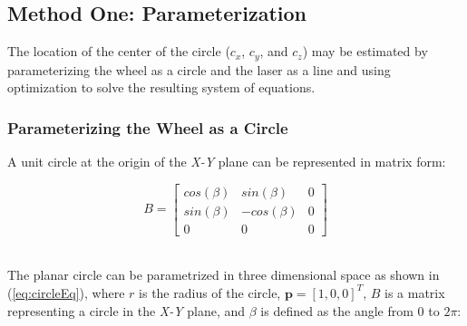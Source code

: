 \documentclass[12pt]{article}
\begin{document}
\subsection{Method One: Parameterization}

The location of the center of the circle ($c_x$, $c_y$, and $c_z$) may be estimated by parameterizing the wheel as a circle and the laser as a line and using optimization to solve the resulting system of equations. 


\subsubsection{Parameterizing the Wheel as a Circle}

A unit circle at the origin of the \textit{X-Y} plane can be represented in matrix form:  

\begin{equation}
	B=\begin{bmatrix}
       cos(\beta) & sin(\beta) & 0 \\
       sin(\beta) & -cos(\beta) & 0\\
       0 & 0 & 0
    \end{bmatrix}
    \label{eq:circleXY}
\end{equation}
\\

The planar circle can be parametrized in three dimensional space as shown in (\ref{eq:circleEq}), where $r$ is the radius of the circle, $\mathbf{p} = [1,0,0]^T$, $B$ is a matrix representing a circle in the \textit{X-Y} plane, and $\beta$ is defined as the angle from $0$ to $2\pi$:
\end{document}
